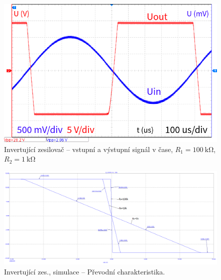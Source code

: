 \documentclass{protokol}
\begin{document}
\begin{figure}[h!]
	\centering
	\includegraphics[width=\textwidth]{oscilo/output13.png}
	\centering
	\caption{Invertující zesilovač -- vstupní a	výstupní signál v čase, $R_1=\SI{100}{\kilo\ohm}$, $R_2=\SI{1}{\kilo\ohm}$}
	\label{fig:i-l-prenos-100k}
\end{figure}
	
	\begin{figure}[h!]
		\centering
		\includegraphics[width=\textwidth]{numerika/Inverting/3_dc_zesileni.png}
		\centering
		\caption{Invertující zes., simulace -- Převodní charakteristika.}
		\label{fig:i-s-prevodni}
	\end{figure}
	
		
		
\end{document}

